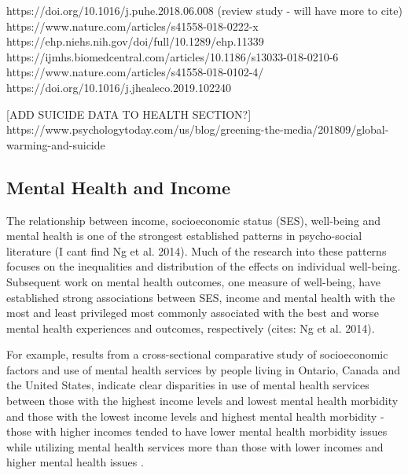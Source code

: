 \documentclass{article}
\begin{document}



https://doi.org/10.1016/j.puhe.2018.06.008 (review study - will have more to cite)
https://www.nature.com/articles/s41558-018-0222-x
https://ehp.niehs.nih.gov/doi/full/10.1289/ehp.11339
https://ijmhs.biomedcentral.com/articles/10.1186/s13033-018-0210-6
https://www.nature.com/articles/s41558-018-0102-4/
https://doi.org/10.1016/j.jhealeco.2019.102240

[ADD SUICIDE DATA TO HEALTH SECTION?]
https://www.psychologytoday.com/us/blog/greening-the-media/201809/global-warming-and-suicide

\subsection{Mental Health and Income}


The relationship between income, socioeconomic status (SES), well-being and mental health is one of the strongest established patterns in psycho-social literature \citep{Easterlin1974Jan, holzer1986increased, Perry1996Sep} (I cant find Ng et al. 2014). Much of the research into these patterns focuses on the inequalities and distribution of the effects on individual well-being. Subsequent work on mental health outcomes, one measure of well-being, have established strong associations between SES, income and mental health with the most and least privileged most commonly associated with the best and worse mental health experiences and outcomes, respectively \citep{Sevenson2008Aug}(cites: Ng et al. 2014). 

For example, results from a cross-sectional comparative study of socioeconomic factors and use of mental health services by people living in Ontario, Canada and the United States, indicate clear disparities in use of mental health services between those with the highest income levels and lowest mental health morbidity and those with the lowest income levels and highest mental health morbidity - those with higher incomes tended to have lower mental health morbidity issues while utilizing mental health services more than those with lower incomes and higher mental health issues \citep{Katz1997}. 
\end{document}
